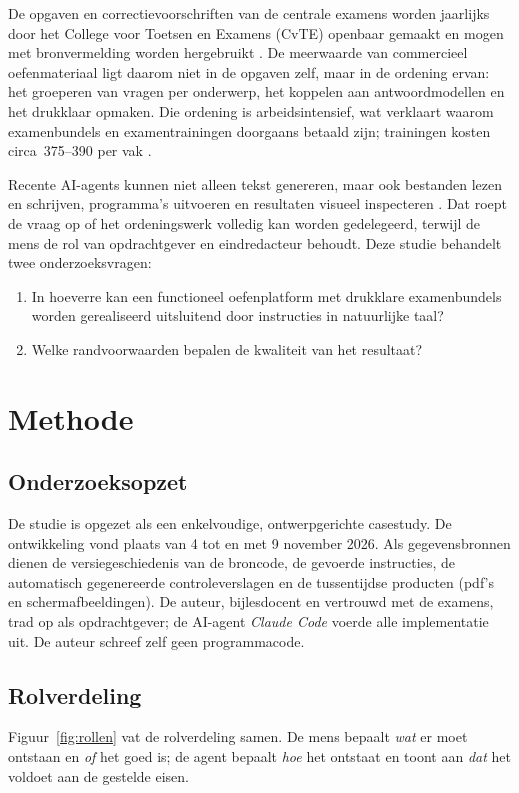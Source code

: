 \documentclass[10.5pt,a4paper]{article}
\begin{document}
De opgaven en correctievoorschriften van de centrale examens worden jaarlijks door het College voor Toetsen en Examens
(CvTE) openbaar gemaakt en mogen met bronvermelding worden hergebruikt \cite{copyright}. De meerwaarde van commercieel
oefenmateriaal ligt daarom niet in de opgaven zelf, maar in de ordening ervan: het groeperen van vragen per onderwerp, het
koppelen aan antwoordmodellen en het drukklaar opmaken. Die ordening is arbeidsintensief, wat verklaart waarom
examenbundels en examentrainingen doorgaans betaald zijn; trainingen kosten circa \texteuro\,375--390 per vak \cite{markt}.

Recente AI-agents kunnen niet alleen tekst genereren, maar ook bestanden lezen en schrijven, programma's uitvoeren en
resultaten visueel inspecteren \cite{claude}. Dat roept de vraag op of het ordeningswerk volledig kan worden gedelegeerd,
terwijl de mens de rol van opdrachtgever en eindredacteur behoudt. Deze studie behandelt twee onderzoeksvragen:

\begin{enumerate}[label=\textbf{OV\arabic*},leftmargin=3em]
  \item In hoeverre kan een functioneel oefenplatform met drukklare examenbundels worden gerealiseerd uitsluitend door
        instructies in natuurlijke taal?
  \item Welke randvoorwaarden bepalen de kwaliteit van het resultaat?
\end{enumerate}

\section{Methode}

\subsection{Onderzoeksopzet}
De studie is opgezet als een enkelvoudige, ontwerpgerichte casestudy. De ontwikkeling vond plaats van 4 tot en met
9 november 2026. Als gegevensbronnen dienen de versiegeschiedenis van de broncode, de gevoerde instructies, de automatisch
gegenereerde controleverslagen en de tussentijdse producten (pdf's en schermafbeeldingen). De auteur, bijlesdocent en
vertrouwd met de examens, trad op als opdrachtgever; de AI-agent \emph{Claude Code} voerde alle implementatie uit. De
auteur schreef zelf geen programmacode.

\subsection{Rolverdeling}
Figuur~\ref{fig:rollen} vat de rolverdeling samen. De mens bepaalt \emph{wat} er moet ontstaan en \emph{of} het goed is;
de agent bepaalt \emph{hoe} het ontstaat en toont aan \emph{dat} het voldoet aan de gestelde eisen.
\end{document}
